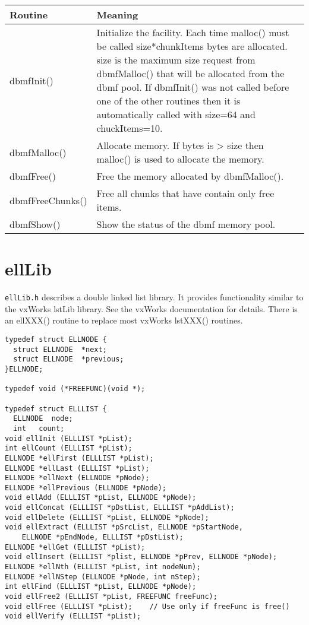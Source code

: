 \begin{center}
\begin{longtable}{p{1.3in}p{4.5in}}
\textbf{Routine} & \textbf{Meaning}\\
\hline
dbmfInit() & Initialize the facility. Each time malloc() must be called size*chunkItems bytes are allocated. size is the maximum size request from dbmfMalloc() that will be allocated from the dbmf pool. If dbmfInit() was not called before one of the other routines then it is automatically called with size=64 and chuckItems=10.\\
dbmfMalloc() & Allocate memory. If bytes is \textgreater{} size then malloc() is used to allocate the memory.\\
dbmfFree() & Free the memory allocated by dbmfMalloc().\\
dbmfFreeChunks() & Free all chunks that have contain only free items.\\
dbmfShow() & Show the status of the dbmf memory pool.
\end{longtable}

\end{center}


\section{ellLib}

\verb|ellLib.h| describes a double linked list library. It provides functionality similar to the vxWorks lstLib library. See the 
vxWorks documentation for details. There is an ellXXX() routine to replace most vxWorks lstXXX() routines.

\begin{verbatim}
typedef struct ELLNODE {
  struct ELLNODE  *next;
  struct ELLNODE  *previous;
}ELLNODE;

typedef void (*FREEFUNC)(void *);

typedef struct ELLLIST {
  ELLNODE  node;
  int   count;
void ellInit (ELLLIST *pList);
int ellCount (ELLLIST *pList);
ELLNODE *ellFirst (ELLLIST *pList);
ELLNODE *ellLast (ELLLIST *pList);
ELLNODE *ellNext (ELLNODE *pNode);
ELLNODE *ellPrevious (ELLNODE *pNode);
void ellAdd (ELLLIST *pList, ELLNODE *pNode);
void ellConcat (ELLLIST *pDstList, ELLLIST *pAddList);
void ellDelete (ELLLIST *pList, ELLNODE *pNode);
void ellExtract (ELLLIST *pSrcList, ELLNODE *pStartNode,
    ELLNODE *pEndNode, ELLLIST *pDstList);
ELLNODE *ellGet (ELLLIST *pList);
void ellInsert (ELLLIST *plist, ELLNODE *pPrev, ELLNODE *pNode);
ELLNODE *ellNth (ELLLIST *pList, int nodeNum);
ELLNODE *ellNStep (ELLNODE *pNode, int nStep);
int ellFind (ELLLIST *pList, ELLNODE *pNode);
void ellFree2 (ELLLIST *pList, FREEFUNC freeFunc);
void ellFree (ELLLIST *pList);    // Use only if freeFunc is free()
void ellVerify (ELLLIST *pList);
\end{verbatim}

